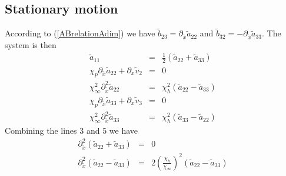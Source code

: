 \documentclass[
10pt, %
a4paper, %
oneside, %
headinclude,footinclude, %
table
]{scrartcl}
\begin{document}
\subsection{Stationary motion}
According to (\ref{ABrelationAdim}) we have $\tilde{b}_{23}= \partial_{\tilde{x}}\tilde{a}_{22}$ and $\tilde{b}_{32}=- \partial_{\tilde{x}}\tilde{a}_{33}$. The system is then 
\begin{equation}\label{StationnnaryMotion2}
\begin{array}{rcl}
\tilde{a}_{11}&=&\frac{1}{2}\left(\tilde{a}_{22}+\tilde{a}_{33}\right)  \\[6pt]
 \chi_p \partial_{\tilde{x}}\tilde{a}_{22}+\partial_{x}\tilde{v}_2&=&0 \\
\chi _{\infty }^2 \partial_{\tilde{x}}^2\tilde{a}_{22} &=&\chi _h^2 \left(\tilde{a}_{22}-\tilde{a}_{33}\right)\\[6pt]
 \chi_p \partial_{\tilde{x}}\tilde{a}_{33}+\partial_{x}\tilde{v}_3&=&0 \\
\chi _{\infty }^2 \partial_{\tilde{x}}^2\tilde{a}_{33} &=&\chi _h^2 \left(\tilde{a}_{33}-\tilde{a}_{22}\right)
\end{array}
\end{equation}  
Combining the lines 3 and 5 we have
$$
\begin{array}{rcl}
\partial_{\tilde{x}}^2(\tilde{a}_{22}+\tilde{a}_{33})&=&0\\
 \partial_{\tilde{x}}^2(\tilde{a}_{22}-\tilde{a}_{33}) &=&2(\frac{\chi _h}{\chi _{\infty }})^2 \left(\tilde{a}_{22}-\tilde{a}_{33}\right) 
\end{array}
 $$
\end{document}
